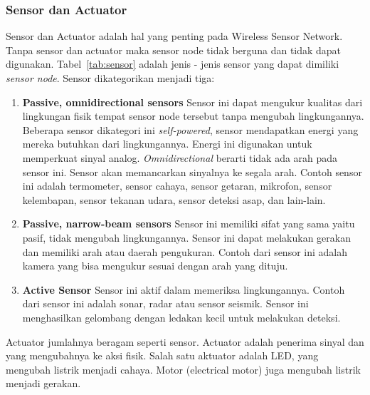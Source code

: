 \subsubsection{Sensor dan Actuator}
Sensor dan Actuator adalah hal yang penting pada Wireless Sensor Network. Tanpa sensor dan actuator maka sensor node tidak berguna dan tidak dapat digunakan. Tabel~\ref{tab:sensor} adalah jenis - jenis sensor yang dapat dimiliki \textit{sensor node}. Sensor dikategorikan menjadi tiga:
\begin{enumerate}
	\item \textbf{Passive, omnidirectional sensors} Sensor ini dapat mengukur kualitas dari lingkungan fisik tempat sensor node tersebut tanpa mengubah lingkungannya. Beberapa sensor dikategori ini \textit{self-powered}, sensor mendapatkan energi yang mereka butuhkan dari lingkungannya. Energi ini digunakan untuk memperkuat sinyal analog. \textit{Omnidirectional} berarti tidak ada arah pada sensor ini. Sensor akan memancarkan sinyalnya ke segala arah. Contoh sensor ini adalah termometer, sensor cahaya, sensor getaran, mikrofon, sensor kelembapan, sensor tekanan udara, sensor deteksi asap, dan lain-lain.
	\item \textbf{Passive, narrow-beam sensors} Sensor ini memiliki sifat yang sama yaitu pasif, tidak mengubah lingkungannya. Sensor ini dapat melakukan gerakan dan memiliki arah atau daerah pengukuran. Contoh dari sensor ini adalah kamera yang bisa mengukur sesuai dengan arah yang dituju.
	\item \textbf{Active Sensor} Sensor ini aktif dalam memeriksa lingkungannya. Contoh dari sensor ini adalah sonar, radar atau sensor seismik. Sensor ini menghasilkan gelombang dengan ledakan kecil untuk melakukan deteksi.
\end{enumerate}

Actuator jumlahnya beragam seperti sensor. Actuator adalah penerima sinyal dan yang mengubahnya ke aksi fisik. Salah satu aktuator adalah LED, yang mengubah listrik menjadi cahaya. Motor (electrical motor) juga mengubah listrik menjadi gerakan.


